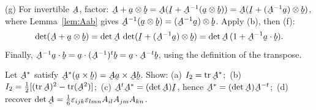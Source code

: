 \begin{solution}
(g) For invertible $\bA$, factor:
$\bA+\ba\otimes\bb=\bA(\I+\bA^{-1}(\ba\otimes\bb))
=\bA(\I+(\bA^{-1}\ba)\otimes\bb)$,
where Lemma~\ref{lem:Aab} gives
$\bA^{-1}(\ba\otimes\bb)=(\bA^{-1}\ba)\otimes\bb$. Apply (b), then (f):
\[
\det(\bA+\ba\otimes\bb)=\det\bA\,\det(\I+(\bA^{-1}\ba)\otimes\bb)
=\det\bA\,(1+\ip{\bA^{-1}\ba}\bb).
\]
Finally, $\ip{\bA^{-1}\ba}\bb=\ip\ba{(\bA^{-1})^t\bb}=\ip\ba{\bA^{-t}\bb}$,
using the definition of the transpose.
\end{solution}

\begin{problem}
Let $\bA^{*}$ satisfy $\bA^{*}(\ba\times\bb)=\bA\ba\times\bA\bb$. Show:
(a) $I_2=\tr\bA^{*}$;\ (b) $I_2=\tfrac12[(\tr\bA)^2-\tr(\bA^2)]$;\
(c) $\bA^{t}\bA^{*}=(\det\bA)\I$, hence $\bA^{*}=(\det\bA)\bA^{-t}$;\
(d) recover $\det\bA=\tfrac16\eps_{ijk}\eps_{lmn}A_{il}A_{jm}A_{kn}$.
\end{problem}

